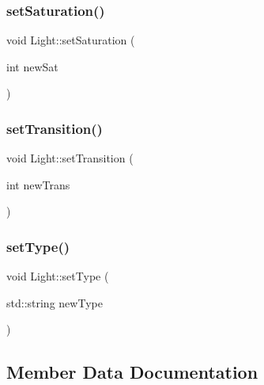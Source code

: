 \mbox{\label{class_light_a81c65b7b6a3cb135a69591c0640cd5e9}} 
\subsubsection{\texorpdfstring{set\+Saturation()}{setSaturation()}}
{\footnotesize\ttfamily void Light\+::set\+Saturation (\begin{DoxyParamCaption}\item[{int}]{new\+Sat }\end{DoxyParamCaption})\hspace{0.3cm}{\ttfamily [inline]}}

\mbox{\label{class_light_a2daccaa69755e4397a85a830c7caaba1}} 
\subsubsection{\texorpdfstring{set\+Transition()}{setTransition()}}
{\footnotesize\ttfamily void Light\+::set\+Transition (\begin{DoxyParamCaption}\item[{int}]{new\+Trans }\end{DoxyParamCaption})\hspace{0.3cm}{\ttfamily [inline]}}

\mbox{\label{class_light_a9bc02e6694d481e938e2b9710fd3ff9f}} 
\subsubsection{\texorpdfstring{set\+Type()}{setType()}}
{\footnotesize\ttfamily void Light\+::set\+Type (\begin{DoxyParamCaption}\item[{std\+::string}]{new\+Type }\end{DoxyParamCaption})\hspace{0.3cm}{\ttfamily [inline]}}



\subsection{Member Data Documentation}
\mbox{\label{class_light_a34001347a7ae6d2b3e0b12cfedc9aadf}} 
